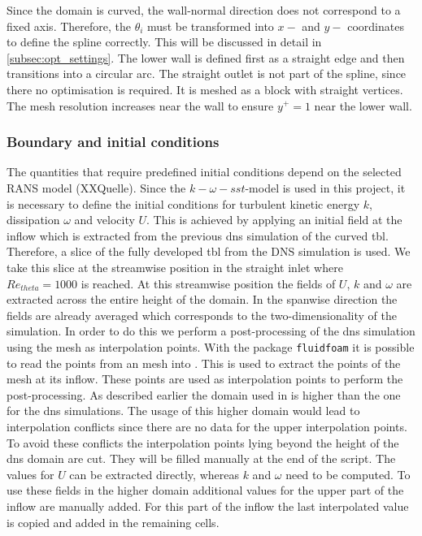 Since the domain is curved, the wall-normal direction does not correspond to a fixed axis. 
Therefore, the  $\theta_i$ must be transformed into  $x-$ and $y-$ coordinates to define the spline correctly.
This will be discussed in detail in \autoref{subsec:opt_settings}.
The lower wall is defined first as a straight edge and then transitions into a circular arc.
The straight outlet is not part of the spline, since there no optimisation is required.
It is meshed as a block with straight vertices.
The mesh resolution increases near the wall to ensure $y^+ = 1$ near the lower wall.






\subsubsection{Boundary and initial conditions}
The quantities that require predefined initial conditions depend on the selected RANS model (XXQuelle). 
Since  the $k-\omega-sst$-model is used in this project, it is necessary to define the initial conditions for turbulent kinetic energy $k$, dissipation $\omega$ and velocity $U$. 
This is achieved by applying an initial field at the inflow which is extracted from the previous \acrshort{dns} simulation of the curved \acrshort{tbl}.
Therefore, a slice of the fully developed \acrshort{tbl} from the DNS simulation is used.
We take this slice at the streamwise position in the straight inlet where $Re_{theta} = 1000$ is reached.
At this streamwise position the fields of $U$, $k$ and $\omega$ are extracted across the entire height of the domain. 
In the spanwise direction the fields are already averaged which corresponds to the two-dimensionality of the  simulation.
In order to do this we perform a post-processing of the \acrshort{dns} simulation using the  mesh as interpolation points.
With the  package \texttt{fluidfoam} it is possible to read the points from an  mesh into . 
This is used to extract the points of the  mesh at its inflow.
These points are used as interpolation points to perform the post-processing. 
As described earlier the domain used in  is higher than the one for the \acrshort{dns} simulations.
The usage of this higher domain would lead to interpolation conflicts since there are no data for the upper interpolation points. 
To avoid these conflicts the interpolation points lying beyond the height of the \acrshort{dns} domain are cut.
They will be filled manually at the end of the script.
The values for $U$ can be extracted directly, whereas $k$ and $\omega$ need to be computed. 
To use these fields in the higher  domain additional values for the upper part of the inflow are manually added. 
For this part of the inflow the last interpolated value is copied and added in the remaining cells.

